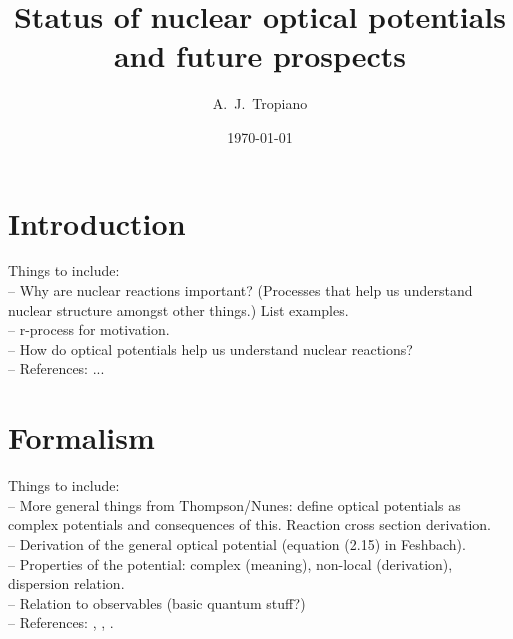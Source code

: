 \documentclass[preprintnumbers,floatfix,aps,prc,preprint,nofootinbib]{revtex4-1}
\begin{document}
\title{Status of nuclear optical potentials and future prospects}


\author{A.~J.~Tropiano}


\date{\today}

\maketitle

\newpage


\section{Introduction}
\label{sec:intro}


Things to include:
\\
-- Why are nuclear reactions important? (Processes that help us understand nuclear structure amongst other things.) List examples.
\\
-- r-process for motivation.
\\
-- How do optical potentials help us understand nuclear reactions?
\\
-- References: ...


\section{Formalism}
\label{sec:formalism}


Things to include:
\\
-- More general things from Thompson/Nunes: define optical potentials as complex potentials and consequences of this. Reaction cross section derivation.
\\
-- Derivation of the general optical potential (equation (2.15) in Feshbach).
\\
-- Properties of the potential: complex (meaning), non-local (derivation), dispersion relation.
\\
-- Relation to observables (basic quantum stuff?)
\\
-- References: \cite{Feshbach:1958nx}, \cite{Feshbach:1962ut}, \cite{thompson_nunes_2009}.


\end{document}
